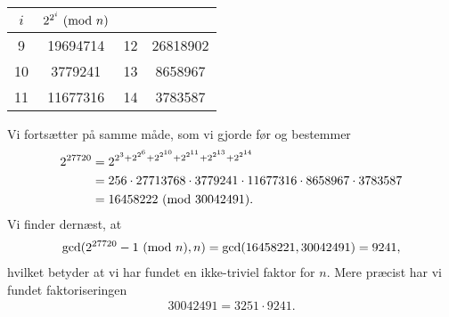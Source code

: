 \begin{example}
\begin{center}
\begin{tabular}{c c c c}
$i$ & $2^{2^i} \ (\mathrm{mod} \ n)$ & &  \\ 
\hline 
9 & 19694714 & 12 & 26818902 \\ 
10 & 3779241 & 13 & 8658967 \\ 
11 & 11677316 & 14 & 3783587 \\ 
\end{tabular} 
\end{center}

Vi fortsætter på samme måde, som vi gjorde før og bestemmer
\begin{align*}
	2^{27720} &= 2^{2^3 + 2^{2^6} + 2^{2^{10}} + 2^{2^{11}} + 2^{2^{13}} + 2^{2^{14}}} \\
	&= 256 \cdot 27713768 \cdot 3779241 \cdot 11677316 \cdot 8658967 \cdot 3783587 \\
	&= 16458222 \ (\mathrm{mod} \ 30042491).
\end{align*}
Vi finder dernæst, at
\begin{align*}
	\gcd(2^{27720} - 1 \ (\mathrm{mod} \ n), n) = \gcd(16458221, 30042491) = 9241,
\end{align*}
hvilket betyder at vi har fundet en ikke-triviel faktor for $n$. Mere præcist har vi fundet faktoriseringen
\begin{align*}
	30042491 = 3251 \cdot 9241.
\end{align*}

\end{example}